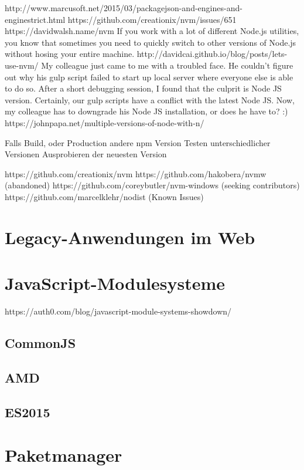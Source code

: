 http://www.marcusoft.net/2015/03/packagejson-and-engines-and-enginestrict.html
https://github.com/creationix/nvm/issues/651
https://davidwalsh.name/nvm
    If you work with a lot of different Node.js utilities, you know that sometimes you need to quickly switch to other versions of Node.js without hosing your entire machine.
http://davidcai.github.io/blog/posts/lets-use-nvm/
    My colleague just came to me with a troubled face. He couldn’t figure out why his gulp script failed to start up local server where everyone else is able to do so. After a short debugging session, I found that the culprit is Node JS version. Certainly, our gulp scripts have a conflict with the latest Node JS. Now, my colleague has to downgrade his Node JS installation, or does he have to? :)
https://johnpapa.net/multiple-versions-of-node-with-n/


Falls Build, oder Production andere npm Version
Testen unterschiedlicher Versionen
Ausprobieren der neuesten Version

https://github.com/creationix/nvm
https://github.com/hakobera/nvmw (abandoned)
https://github.com/coreybutler/nvm-windows (seeking contributors)
https://github.com/marcelklehr/nodist (Known Issues)


\section{Legacy-Anwendungen im Web}
\label{sec:legacy-applications}


\section{JavaScript-Modulesysteme}
\label{sec:js-modulesystems}
https://auth0.com/blog/javascript-module-systems-showdown/
\subsection{CommonJS}
\label{sub:commonjs}
\subsection{AMD}
\label{sub:amd}
\subsection{ES2015}
\label{sub:es2015}


\section{Paketmanager}
\label{sec:package-managers}

